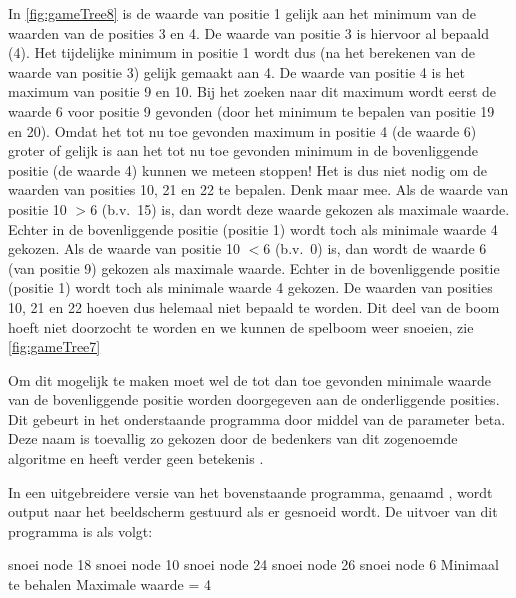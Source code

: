 \begin{cpplstShortInline}
In \cref{fig:gameTree8} is de waarde van positie 1 gelijk aan het minimum van de waarden van de posities 3 en 4.
De waarde van positie 3 is hiervoor al bepaald (4).
Het tijdelijke minimum in positie 1 wordt dus (na het berekenen van de waarde van positie 3) gelijk gemaakt aan 4.
De waarde van positie 4 is het maximum van positie 9 en 10.
Bij het zoeken naar dit maximum wordt eerst de waarde 6 voor positie 9 gevonden (door het minimum te bepalen van positie 19 en 20).
Omdat het tot nu toe gevonden maximum in positie 4 (de waarde 6) groter of gelijk is aan het tot nu toe gevonden minimum in de bovenliggende positie (de waarde 4) kunnen we meteen stoppen!
Het is dus niet nodig om de waarden van posities 10, 21 en 22 te bepalen.
Denk maar mee.
Als de waarde van positie 10 $>$6 (b.v.\ 15) is, dan wordt deze waarde gekozen als maximale waarde.
Echter in de bovenliggende positie (positie 1) wordt toch als minimale waarde 4 gekozen.
Als de waarde van positie 10 $<$6 (b.v.\ 0) is, dan wordt de waarde 6 (van positie 9) gekozen als maximale waarde.
Echter in de bovenliggende positie (positie 1) wordt toch als minimale waarde 4 gekozen.
De waarden van posities 10, 21 en 22 hoeven dus helemaal niet bepaald te worden.
Dit deel van de boom hoeft niet doorzocht te worden en we kunnen de spelboom weer snoeien, zie \cref{fig:gameTree7}


Om dit mogelijk te maken moet wel de tot dan toe gevonden minimale waarde van de bovenliggende positie worden doorgegeven aan de onderliggende posities.
Dit gebeurt in het onderstaande programma  door middel van de parameter beta.
Deze naam is toevallig zo gekozen door de bedenkers van dit zogenoemde  algoritme en heeft verder geen betekenis \cite{Knuth1975}.


In een uitgebreidere versie van het bovenstaande programma, genaamd , wordt output naar het beeldscherm gestuurd als er gesnoeid wordt.
De uitvoer van dit programma is als volgt:
\begin{coutput}
snoei node 18
snoei node 10
snoei node 24
snoei node 26
snoei node 6
Minimaal te behalen Maximale waarde = 4
\end{coutput}


\end{cpplstShortInline}
